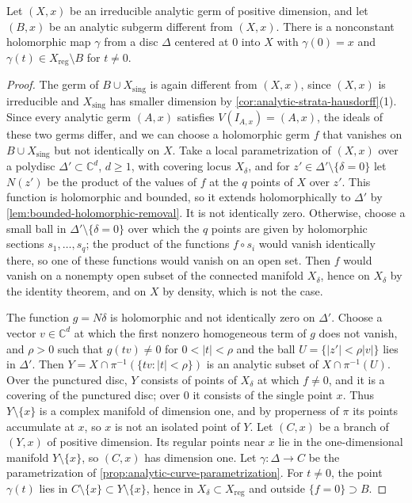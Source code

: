 \begin{proposition}\label{prop:analytic-curve-selection}
Let $(X,x)$ be an irreducible analytic germ of positive dimension, and let $(B,x)$ be an analytic subgerm different from $(X,x)$. There is a nonconstant holomorphic map $\gamma$ from a disc $\Delta$ centered at $0$ into $X$ with $\gamma(0)=x$ and $\gamma(t)\in X_{\mathrm{reg}}\setminus B$ for $t\neq0$.
\end{proposition}
\begin{proof}
The germ of $B\cup X_{\mathrm{sing}}$ is again different from $(X,x)$, since $(X,x)$ is irreducible and $X_{\mathrm{sing}}$ has smaller dimension by \cref{cor:analytic-strata-hausdorff}(1). Since every analytic germ $(A,x)$ satisfies $V(I_{A,x})=(A,x)$, the ideals of these two germs differ, and we can choose a holomorphic germ $f$ that vanishes on $B\cup X_{\mathrm{sing}}$ but not identically on $X$. Take a local parametrization of $(X,x)$ over a polydisc $\Delta'\subset\mathbb C^d$, $d\geq1$, with covering locus $X_\delta$, and for $z'\in\Delta'\setminus\{\delta=0\}$ let $N(z')$ be the product of the values of $f$ at the $q$ points of $X$ over $z'$. This function is holomorphic and bounded, so it extends holomorphically to $\Delta'$ by \cref{lem:bounded-holomorphic-removal}. It is not identically zero. Otherwise, choose a small ball in $\Delta'\setminus\{\delta=0\}$ over which the $q$ points are given by holomorphic sections $s_1,\ldots,s_q$; the product of the functions $f\circ s_i$ would vanish identically there, so one of these functions would vanish on an open set. Then $f$ would vanish on a nonempty open subset of the connected manifold $X_\delta$, hence on $X_\delta$ by the identity theorem, and on $X$ by density, which is not the case.

The function $g=N\delta$ is holomorphic and not identically zero on $\Delta'$. Choose a vector $v\in\mathbb C^d$ at which the first nonzero homogeneous term of $g$ does not vanish, and $\rho>0$ such that $g(tv)\neq0$ for $0<|t|<\rho$ and the ball $U=\{|z'|<\rho|v|\}$ lies in $\Delta'$. Then $Y=X\cap\pi^{-1}(\{tv:|t|<\rho\})$ is an analytic subset of $X\cap\pi^{-1}(U)$. Over the punctured disc, $Y$ consists of points of $X_\delta$ at which $f\neq0$, and it is a covering of the punctured disc; over $0$ it consists of the single point $x$. Thus $Y\setminus\{x\}$ is a complex manifold of dimension one, and by properness of $\pi$ its points accumulate at $x$, so $x$ is not an isolated point of $Y$. Let $(C,x)$ be a branch of $(Y,x)$ of positive dimension. Its regular points near $x$ lie in the one-dimensional manifold $Y\setminus\{x\}$, so $(C,x)$ has dimension one. Let $\gamma\colon\Delta\to C$ be the parametrization of \cref{prop:analytic-curve-parametrization}. For $t\neq0$, the point $\gamma(t)$ lies in $C\setminus\{x\}\subset Y\setminus\{x\}$, hence in $X_\delta\subset X_{\mathrm{reg}}$ and outside $\{f=0\}\supset B$.
\end{proof}

